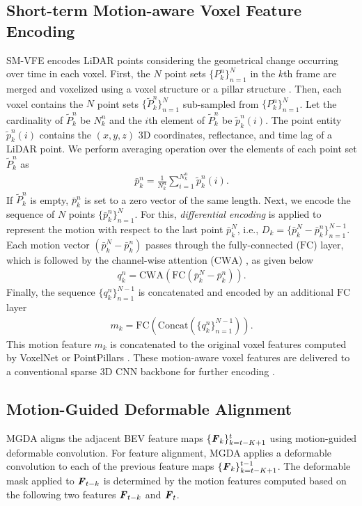 \documentclass[letterpaper]{article} \usepackage{aaai23}  \usepackage{times}  \usepackage{helvet}  \usepackage{courier}  \usepackage[hyphens]{url}  \usepackage{graphicx} \urlstyle{rm} \def\UrlFont{\rm}  \usepackage{natbib}  \usepackage{caption} \frenchspacing  \setlength{\pdfpagewidth}{8.5in} \usepackage{algorithm}
\begin{document}
\subsection{Short-term Motion-aware Voxel Feature Encoding}
SM-VFE encodes LiDAR points considering the geometrical change occurring over time in each voxel. First, the $N$ point sets $\{P_k^n \}_{n=1}^{N}$ in the $k$th frame are merged and voxelized using a voxel structure \cite{voxelnet} or a pillar structure \cite{pointpillars}. Then, each voxel contains the $N$ point sets $\{\tilde{P}_k^n \}_{n=1}^{N}$ sub-sampled from $\{P_k^n \}_{n=1}^{N}$.  Let the cardinality of  $\tilde{P}_k^n$ be $N_k^n$ and the $i$th element of $\tilde{P}_k^n$ be  $\tilde{p}_k^n(i)$. The point entity $\tilde{p}_k^n(i)$ contains the $(x,y,z)$ 3D coordinates, reflectance, and time lag of a LiDAR point. We perform averaging operation over the elements of each point set $\tilde{P}_k^n$ as
\begin{align}
    \bar{p}_{k}^{n} = \frac{1}{N_{k}^n}\sum_{i=1}^{N_{k}^n} \tilde{p}_{k}^{n}(i).
\end{align}
If $\tilde{P}_{k}^{n}$ is empty, $\bar{p}_{k}^{n}$ is set to a zero vector of the same length. 
Next, we encode the sequence of $N$ points $\{\bar{p}_{k}^{n}\}_{n=1}^{N}$. For this, {\it differential encoding} is applied to represent the motion with respect to the last point $\bar{p}_{k}^{N}$, i.e., 
$D_k = \{\bar{p}_{k}^{N}-\bar{p}_{k}^{n}\}_{n=1}^{N-1}$. Each motion vector $(\bar{p}_{k}^{N}-\bar{p}_{k}^{n})$ passes through the fully-connected ($\mathrm{FC}$) layer, which is followed by the channel-wise attention ($\mathrm{CWA}$) \cite{senet}, as given below
\begin{align}
    q_{k}^{n} = \mathrm{CWA}(\mathrm{FC}(\bar{p}_{k}^{N}-\bar{p}_{k}^{n})).
\end{align}
Finally, the sequence $\{q_{k}^{n}\}_{n=1}^{N-1}$ is concatenated and encoded by an additional $\mathrm{FC}$ layer 
\begin{align}
    m_{k} = \mathrm{FC}(\mathrm{Concat}(\{q_{k}^{n}\}_{n=1}^{N-1})).
\end{align}
This motion feature $m_{k}$ is concatenated to the original voxel features computed by VoxelNet \cite{voxelnet} or PointPillars \cite{pointpillars}. These motion-aware voxel features are delivered to a conventional sparse 3D CNN backbone for further encoding \cite{second}.


\subsection{Motion-Guided Deformable Alignment}
MGDA aligns the adjacent BEV feature maps $\{\textbf{\textit{F}}_{k}\}_{k=t-K+1}^{t}$ using motion-guided deformable convolution.
For feature alignment, MGDA applies a deformable convolution \cite{deformV2} to each of the previous feature maps $\{\textbf{\textit{F}}_{k}\}_{k=t-K+1}^{t-1}$. The deformable mask applied to $\textbf{\textit{F}}_{t-k}$ is determined by the motion features computed based on the following two features $\textbf{\textit{F}}_{t-k}$ and $\textbf{\textit{F}}_{t}$. 
\end{document}

